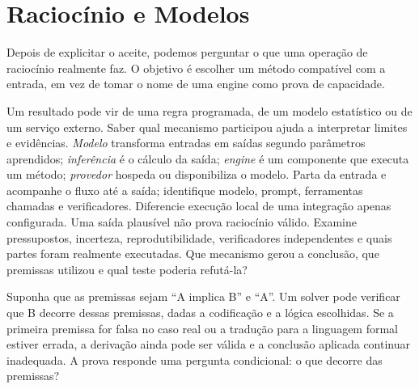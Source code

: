 \chapter{Raciocínio e Modelos}

Depois de explicitar o aceite, podemos perguntar o que uma operação de raciocínio realmente faz. O objetivo é escolher um método compatível com a entrada, em vez de tomar o nome de uma engine como prova de capacidade.


\roteirodidatico
{Um resultado pode vir de uma regra programada, de um modelo estatístico ou de um serviço externo. Saber qual mecanismo participou ajuda a interpretar limites e evidências.}
{\emph{Modelo} transforma entradas em saídas segundo parâmetros aprendidos; \emph{inferência} é o cálculo da saída; \emph{engine} é um componente que executa um método; \emph{provedor} hospeda ou disponibiliza o modelo.}
{Parta da entrada e acompanhe o fluxo até a saída; identifique modelo, prompt, ferramentas chamadas e verificadores. Diferencie execução local de uma integração apenas configurada.}
{Uma saída plausível não prova raciocínio válido. Examine pressupostos, incerteza, reprodutibilidade, verificadores independentes e quais partes foram realmente executadas.}
{Que mecanismo gerou a conclusão, que premissas utilizou e qual teste poderia refutá-la?}

{Suponha que as premissas sejam ``A implica B'' e ``A''. Um solver pode verificar que B decorre dessas premissas, dadas a codificação e a lógica escolhidas. Se a primeira premissa for falsa no caso real ou a tradução para a linguagem formal estiver errada, a derivação ainda pode ser válida e a conclusão aplicada continuar inadequada. A prova responde uma pergunta condicional: o que decorre das premissas?}

